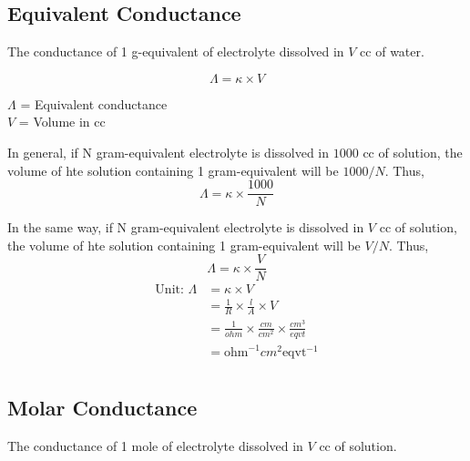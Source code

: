 \documentclass[12pt]{article}
\begin{document}
\subsection*{Equivalent Conductance}
The conductance of 1 g-equivalent of electrolyte dissolved in $V$ cc of water. \\
\begin{minipage}{0.5\textwidth}
    $$ \Lambda = \kappa \times V $$
\end{minipage}
\hfill\vline\hfill
\begin{minipage}{0.4\textwidth}
    $\Lambda$ = Equivalent conductance \\
    $V$ = Volume in cc
\end{minipage} \vspace{.5cm}

In general, if N gram-equivalent electrolyte is dissolved in $1000$ cc of solution, the volume of hte solution containing 1 gram-equivalent will be $1000/N$. Thus,
$$ \Lambda = \kappa \times \frac{1000}{N} $$

In the same way, if N gram-equivalent electrolyte is dissolved in $V$ cc of solution, the volume of hte solution containing 1 gram-equivalent will be $V/N$. Thus,
$$ \Lambda = \kappa \times \frac{V}{N} $$
\begin{align*}
    \text{Unit: }
    \Lambda &= \kappa \times V \\
    &= \frac{1}{R} \times \frac{l}{A} \times V \\
    &= \frac{1}{ohm} \times \frac{cm}{cm^2} \times \frac{cm^3}{eqvt} \\
    &= \text{ohm}^{-1} cm^2 \text{eqvt}^{-1} \\
\end{align*}

\subsection*{Molar Conductance}
The conductance of 1 mole of electrolyte dissolved in $V$ cc of solution.





    
\end{document}

